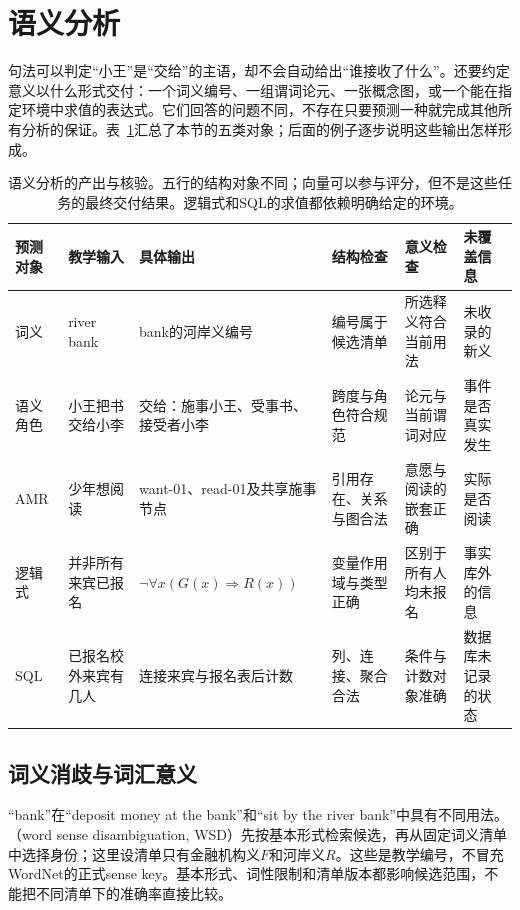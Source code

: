 \section{语义分析}
\label{sec:nlp-analysis-semantics}

句法可以判定“小王”是“交给”的主语，却不会自动给出“谁接收了什么”。还要约定意义以什么形式交付：一个词义编号、一组谓词论元、一张概念图，或一个能在指定环境中求值的表达式。它们回答的问题不同，不存在只要预测一种就完成其他所有分析的保证。表~\ref{tab:nlp-analysis-semantic-outputs}汇总了本节的五类对象；后面的例子逐步说明这些输出怎样形成。

\begin{table}[htbp]
  \centering
  \small
  \setlength{\tabcolsep}{3pt}
  \begin{tabular}{@{}p{15mm}p{24mm}p{32mm}p{24mm}p{27mm}p{28mm}@{}}
    \toprule
    预测对象&教学输入&具体输出&结构检查&意义检查&未覆盖信息\\
    \midrule
    词义&river bank&bank的河岸义编号&编号属于候选清单&所选释义符合当前用法&未收录的新义\\
    语义角色&小王把书交给小李&交给：施事小王、受事书、接受者小李&跨度与角色符合规范&论元与当前谓词对应&事件是否真实发生\\
    AMR&少年想阅读&want-01、read-01及共享施事节点&引用存在、关系与图合法&意愿与阅读的嵌套正确&实际是否阅读\\
    逻辑式&并非所有来宾已报名&$\neg\forall x(G(x)\Rightarrow R(x))$&变量作用域与类型正确&区别于所有人均未报名&事实库外的信息\\
    SQL&已报名校外来宾有几人&连接来宾与报名表后计数&列、连接、聚合合法&条件与计数对象准确&数据库未记录的状态\\
    \bottomrule
  \end{tabular}
  \caption{语义分析的产出与核验。五行的结构对象不同；向量可以参与评分，但不是这些任务的最终交付结果。逻辑式和SQL的求值都依赖明确给定的环境。}
  \label{tab:nlp-analysis-semantic-outputs}
\end{table}

\subsection{词义消歧与词汇意义}
\label{sec:nlp-analysis-wsd}

“bank”在“deposit money at the bank”和“sit by the river bank”中具有不同用法。（word sense disambiguation, WSD）先按基本形式检索候选，再从固定词义清单中选择身份；这里设清单只有金融机构义$F$和河岸义$R$。这些是教学编号，不冒充WordNet的正式sense key。基本形式、词性限制和清单版本都影响候选范围，不能把不同清单下的准确率直接比较。

